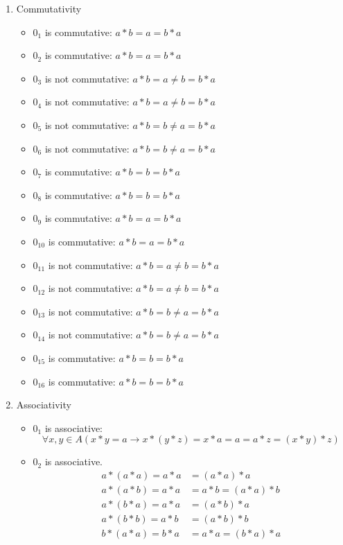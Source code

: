 \begin{enumerate}[label={\Alph*.},font={\bfseries}]
\begin{enumerate}[label={\arabic*},font={\bfseries}]
\begin{minipage}[h]{.25\textwidth}
        \end{minipage}
      \item Commutativity
        \begin{itemize}
          \item $0_1$ is commutative: $a*b=a=b*a$
          \item $0_2$ is commutative: $a*b=a=b*a$
          \item $0_3$ is not commutative: $a*b=a \neq b=b*a$
          \item $0_4$ is not commutative: $a*b=a \neq b=b*a$
          \item $0_5$ is not commutative: $a*b=b \neq a=b*a$
          \item $0_6$ is not commutative: $a*b=b \neq a=b*a$
          \item $0_7$ is commutative: $a*b=b=b*a$
          \item $0_8$ is commutative: $a*b=b=b*a$
          \item $0_9$ is commutative: $a*b=a=b*a$
          \item $0_{10}$ is commutative: $a*b=a=b*a$
          \item $0_{11}$ is not commutative: $a*b=a \neq b=b*a$
          \item $0_{12}$ is not commutative: $a*b=a \neq b=b*a$
          \item $0_{13}$ is not commutative: $a*b=b \neq a=b*a$
          \item $0_{14}$ is not commutative: $a*b=b \neq a=b*a$
          \item $0_{15}$ is commutative: $a*b=b=b*a$
          \item $0_{16}$ is commutative: $a*b=b=b*a$
        \end{itemize}
      \item Associativity
        \begin{itemize}
          \item $0_1$ is associative:
            $$\forall x,y \in A (x*y=a \to x*(y*z)=x*a=a=a*z=(x*y)*z)$$
          \item $0_2$ is associative.
            \begin{align*}
              a*(a*a) = a*a &= (a*a)*a \\
              a*(a*b) = a*a &= a*b = (a*a)*b \\
              a*(b*a) = a*a &= (a*b)*a \\
              a*(b*b) = a*b &= (a*b)*b \\
              b*(a*a) = b*a &= a*a = (b*a)*a \\

\end{align*}
\end{itemize}
\end{enumerate}
\end{enumerate}
